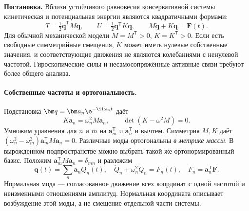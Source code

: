 \textbf{Постановка.} Вблизи устойчивого равновесия консервативной системы кинетическая и потенциальная энергии являются квадратичными формами:
\begin{equation}
 T=\tfrac12\dot{\bm q}^{\mathsf T}M\dot{\bm q},\qquad
 U=\tfrac12{\bm q}^{\mathsf T}K\bm q,\qquad M\ddot{\bm q}+K\bm q=\bm F(t).
\end{equation}
Для обычной механической модели $M=M^{\mathsf T}>0$, $K=K^{\mathsf T}>0$. Если есть свободные симметрийные смещения, $K$ может иметь нулевые собственные значения, и соответствующие движения не являются колебаниями с ненулевой частотой. Гироскопические силы и несамосопряжённые активные связи требуют более общего анализа.

\paragraph{Собственные частоты и ортогональность.}
Подстановка $\bm q=\bm a_n\e^{-\ii\omega_nt}$ даёт
\begin{equation}\label{eq:eigenmodes}
 K\bm a_n=\omega_n^2M\bm a_n,\qquad \det(K-\omega^2M)=0.
\end{equation}
Умножим уравнения для $n$ и $m$ на $\bm a_m^{\mathsf T}$ и $\bm a_n^{\mathsf T}$ и вычтем. Симметрия $M,K$ даёт
$(\omega_n^2-\omega_m^2)\bm a_m^{\mathsf T}M\bm a_n=0$.
Различные моды ортогональны \emph{в метрике массы}. В вырожденном подпространстве можно выбрать такой же ортонормированный базис. Положим $\bm a_m^{\mathsf T}M\bm a_n=\delta_{mn}$ и разложим
\begin{equation}
 \bm q(t)=\sum_n\bm a_nQ_n(t),\quad
 \ddot Q_n+\omega_n^2Q_n=F_n(t),\quad F_n=\bm a_n^{\mathsf T}\bm F.
\end{equation}
Нормальная мода --- согласованное движение всех координат с одной частотой и неизменными отношениями амплитуд. Нормальная координата описывает возбуждение этой моды, а не смещение отдельной части системы.

